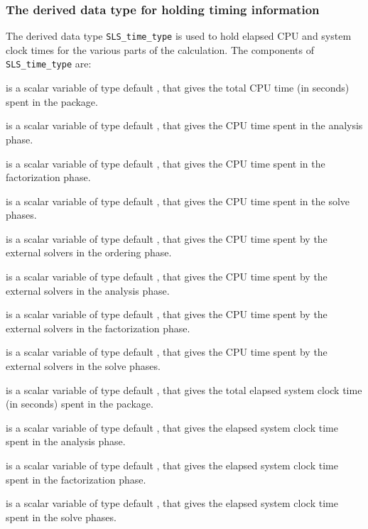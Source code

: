 \documentclass{galahad}
\newcommand{\packagename}{SLS}
\begin{document}
\subsubsection{The derived data type for holding timing
 information}\label{typetime}
The derived data type
{\tt \packagename\_time\_type}
is used to hold elapsed CPU and system clock times for the various parts
of the calculation. The components of
{\tt \packagename\_time\_type}
are:
\begin{description}
 is a scalar variable of type default \realdp, that gives
 the total CPU time (in seconds) spent in the package.

 is a scalar variable of type default \realdp, that gives
 the CPU time spent in the analysis phase.

 is a scalar variable of type default \realdp, that gives
 the CPU time spent in the factorization phase.

 is a scalar variable of type default \realdp, that gives
 the CPU time spent in the solve phases.

 is a scalar variable of type default \realdp, that gives
 the CPU time spent by the external solvers in the ordering phase.

 is a scalar variable of type default \realdp, that gives
 the CPU time spent by the external solvers in the analysis phase.

 is a scalar variable of type default \realdp, that gives
 the CPU time spent by the external solvers in the factorization phase.

 is a scalar variable of type default \realdp, that gives
 the CPU time spent by the external solvers in the solve phases.

 is a scalar variable of type default \realdp, that gives
 the total elapsed system clock time (in seconds) spent in the package.

 is a scalar variable of type default \realdp, that gives
 the elapsed system clock time spent in the analysis phase.

 is a scalar variable of type default \realdp, that gives
 the elapsed system clock time spent in the factorization phase.

 is a scalar variable of type default \realdp, that gives
 the elapsed system clock time spent in the solve phases.


\end{description}
\end{document}
